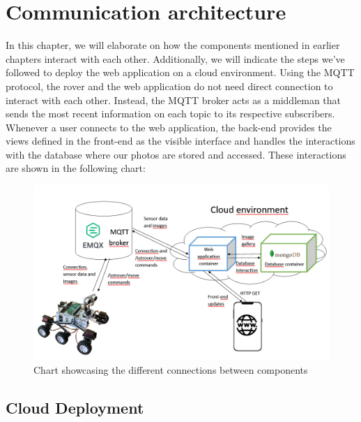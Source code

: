 \chapter{Communication architecture}

In this chapter, we will elaborate on how the components mentioned in earlier chapters interact with each other. Additionally, we will indicate the steps we've followed to deploy the web application on a cloud environment.
Using the MQTT protocol, the rover and the web application do not need direct connection to interact with each other. Instead, the MQTT broker acts as a middleman that sends the most recent information on each topic to its respective subscribers. Whenever a user connects to the web application, the back-end provides the views defined in the front-end as the visible interface and handles the interactions with the database where our photos are stored and accessed. These interactions are shown in the following chart:
\begin{figure}[H]
    \centering
    \includegraphics[width=1\linewidth]{connectionchart.png}
    \caption{Chart showcasing the different connections between components}
    \label{fig:enter-label}
\end{figure}
\section{Cloud Deployment}

